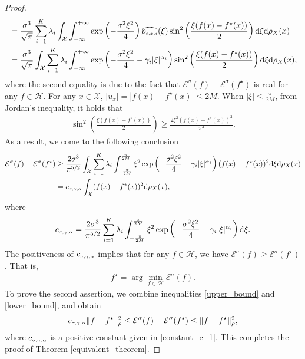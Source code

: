 \documentclass[11pt]{article}
\begin{document}
\begin{proof}
\begin{align*}
	&=\frac{\sigma^3}{\sqrt{\pi}}\sum_{i=1}^K\lambda_i\int_\mathcal{X}\int_{-\infty}^{+\infty}\exp\left(-\frac{\sigma^2\xi^2}{4}\right)\widehat{p_\mathsmaller{{\epsilon,x,i}}}(\xi)\sin^2\left(\frac{\xi(f(x)-f^\star(x))}{2}\right)\mathrm{d}\xi \mathrm{d}\rho_X(x)\\
	&= \frac{\sigma^3}{\sqrt{\pi}}\int_\mathcal{X}\sum_{i=1}^K\lambda_i\int_{-\infty}^{+\infty}\exp\left(-\frac{\sigma^2\xi^2}{4}-\gamma_i|\xi|^{\alpha_i}\right)\sin^2\left(\frac{\xi(f(x)-f^\star(x))}{2}\right)\mathrm{d}\xi \mathrm{d}\rho_X(x),
	\end{align*}
	where the second equality is due to the fact that $\mathcal{E}^\sigma(f)-\mathcal{E}^\sigma(f^\star)$ is real for any $f\in\mathcal{H}$. For any $x\in\mathcal{X}$, $|u_x|=|f(x)-f^\star(x)|\leq 2M$. When $|\xi|\leq \frac{\pi}{2M}$, from Jordan's inequality, it holds that
	\begin{align*}
	\sin^2\left(\frac{\xi(f(x)-f^\star(x))}{2}\right)\geq \frac{2\xi^2(f(x)-f^\star(x))^2}{\pi^2}.
	\end{align*} 
	As a result, we come to the following conclusion
	\begin{align}\label{lower_bound}
	\begin{split}
	\mathcal{E}^\sigma(f)-\mathcal{E}^\sigma(f^\star)&\geq \frac{2\sigma^3}{\pi^{5/2}}\int_{\mathcal{X}}\sum_{i=1}^K\lambda_i\int_{-\frac{\pi}{2M}}^{\frac{\pi}{2M}}\xi^2\exp\left(-\frac{\sigma^2\xi^2}{4}-\gamma_i|\xi|^{\alpha_i}\right)(f(x)-f^\star(x))^2\mathrm{d}\xi \mathrm{d}\rho_X(x)\\
	&=c_\mathsmaller{\sigma,\gamma,\alpha}\int_{\mathcal{X}}(f(x)-f^\star(x))^2\mathrm{d}\rho_X(x),
	\end{split}
	\end{align}
	where  
	\begin{align}\label{constant_c_1}
	c_\mathsmaller{\sigma,\gamma,\alpha}=\frac{2\sigma^3}{\pi^{5/2}} \sum_{i=1}^K\lambda_i\int_{-\frac{\pi}{2M}}^{\frac{\pi}{2M}}\xi^2\exp\left(-\frac{\sigma^2\xi^2}{4}-\gamma_i|\xi|^{\alpha_i}\right)\mathrm{d}\xi.
	\end{align}
	The positiveness of $c_\mathsmaller{\sigma,\gamma,\alpha}$ implies that for any $f\in\mathcal{H}$, we have $\mathcal{E}^\sigma(f)\geq \mathcal{E}^\sigma(f^\star)$. That is,
	\begin{align*}
	f^\star=\arg\min_{f\in\mathcal{H}}\mathcal{E}^\sigma(f).
	\end{align*}
	To prove the second assertion, we combine inequalities \eqref{upper_bound} and \eqref{lower_bound}, and obtain
	\begin{align*}
	c_\mathsmaller{\sigma,\gamma,\alpha} \|f-f^\star\|_\rho^2 \leq \mathcal{E}^\sigma(f)-\mathcal{E}^\sigma(f^\star)\leq  \|f-f^\star\|_\rho^2,
	\end{align*}
	where $c_\mathsmaller{\sigma,\gamma,\alpha}$ is a positive constant given in \eqref{constant_c_1}. This completes the proof of Theorem \ref{equivalent_theorem}.
\end{proof}
\end{document}

